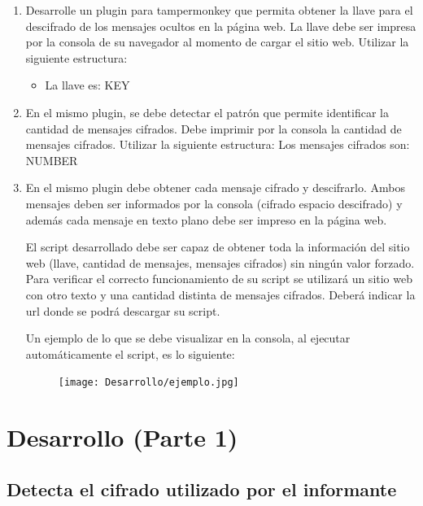 \documentclass[letter,12pt]{article}
\begin{document}
\begin{enumerate}
    \item Desarrolle un plugin para tampermonkey que permita obtener la llave para el descifrado de los mensajes ocultos en la página web. La llave debe ser impresa por la consola de su navegador al momento de cargar el sitio web. Utilizar la siguiente estructura:
    \begin{itemize}
        \item   La llave es: KEY
    \end{itemize}
    
    \item En el mismo plugin, se debe detectar el patrón que permite identificar la cantidad de mensajes cifrados. Debe imprimir por la consola la cantidad de mensajes cifrados. Utilizar la siguiente estructura:
    Los mensajes cifrados son: NUMBER
    
    \item En el mismo plugin debe obtener cada mensaje cifrado y descifrarlo. Ambos mensajes deben ser informados por la consola (cifrado espacio descifrado) y además cada mensaje en texto plano debe ser impreso en la página web. \par
    El script desarrollado debe ser capaz de obtener toda la información del sitio web (llave, cantidad de mensajes, mensajes cifrados) sin ningún valor forzado. Para verificar el correcto funcionamiento de su script se utilizará un sitio web con otro texto y una cantidad distinta de mensajes cifrados. Deberá indicar la url donde se podrá descargar su script.\par
    Un ejemplo de lo que se debe visualizar en la consola, al ejecutar automáticamente el script, es lo siguiente:

    \begin{figure}[H]
        \centering
        \texttt{[image: Desarrollo/ejemplo.jpg]}
        \label{fig:ejemplo}
    \end{figure}

\end{enumerate}

\section{Desarrollo (Parte 1)}
\subsection{Detecta el cifrado utilizado por el informante}
\end{document}
